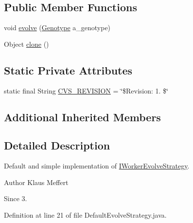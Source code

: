 \subsection*{Public Member Functions}
\begin{DoxyCompactItemize}
\item 
void \hyperlink{classorg_1_1jgap_1_1distr_1_1grid_1_1_default_evolve_strategy_a1e190f538909bffb004ead71df515b92}{evolve} (\hyperlink{classorg_1_1jgap_1_1_genotype}{Genotype} a\-\_\-genotype)
\item 
Object \hyperlink{classorg_1_1jgap_1_1distr_1_1grid_1_1_default_evolve_strategy_a83603815bfa534fd85f550589b16608c}{clone} ()
\end{DoxyCompactItemize}
\subsection*{Static Private Attributes}
\begin{DoxyCompactItemize}
\item 
static final String \hyperlink{classorg_1_1jgap_1_1distr_1_1grid_1_1_default_evolve_strategy_a844a68d1f74050d2b905831d1cee33b1}{C\-V\-S\-\_\-\-R\-E\-V\-I\-S\-I\-O\-N} = \char`\"{}\$Revision\-: 1. \$\char`\"{}
\end{DoxyCompactItemize}
\subsection*{Additional Inherited Members}


\subsection{Detailed Description}
Default and simple implementation of \hyperlink{interfaceorg_1_1jgap_1_1distr_1_1grid_1_1_i_worker_evolve_strategy}{I\-Worker\-Evolve\-Strategy}.

\begin{DoxyAuthor}{Author}
Klaus Meffert 
\end{DoxyAuthor}
\begin{DoxySince}{Since}
3. 
\end{DoxySince}


Definition at line 21 of file Default\-Evolve\-Strategy.\-java.



